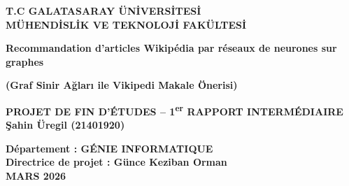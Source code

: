 \begin{titlepage}
    \begin{center}
    	\large
        \vspace{-0.5cm}
    	\textbf{T.C GALATASARAY ÜN\.{I}VERS\.{I}TES\.{I}}\\
        \textbf{MÜHEND\.{I}SL\.{I}K VE TEKNOLOJ\.{I} FAKÜLTES\.{I}}
        \vspace{3.0cm}
        
        \textbf{Recommandation d'articles Wikipédia par réseaux de neurones sur graphes}
        
        \textbf{(Graf Sinir Ağları ile Vikipedi Makale Önerisi)}
        
        \vspace{1.5cm}
        
        \textbf{PROJET DE FIN D'ÉTUDES -- 1\textsuperscript{er} RAPPORT INTERMÉDIAIRE}\\
        
        \textbf{Şahin Üregil (21401920)}
       
        \vspace{1.5cm}
      
        
        \textbf{Département : GÉNIE INFORMATIQUE}\\
        \textbf{Directrice de projet : Günce Keziban Orman}\\
        \vfill
        \textbf{MARS 2026}
       
    \end{center}
\end{titlepage}
\restoregeometry